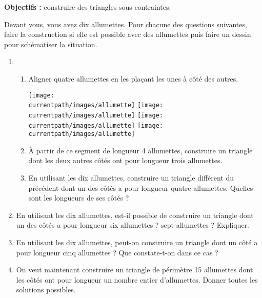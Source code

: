 \begin{activite}
   \begin{changemargin}{-10mm}{-10mm}
      {\bf Objectifs :} construire des triangles sous contraintes.

      Devant vous, vous avez dix allumettes. Pour chacune des questions suivantes, faire la construction si elle est possible avec des allumettes puis faire un dessin pour schématiser la situation.
      \begin{enumerate}
         \item
         \begin{enumerate}
            \item Aligner quatre allumettes en les plaçant les unes à côté des autres.
            \smallskip
            \begin{center}
               \texttt{[image: \\currentpath/images/allumette]}
               \texttt{[image: \\currentpath/images/allumette]}
               \texttt{[image: \\currentpath/images/allumette]}
               \texttt{[image: \\currentpath/images/allumette]}
            \end{center}
            \smallskip
            \item À partir de ce segment de longueur 4 allumettes, construire un triangle dont les deux autres côtés ont pour longueur trois allumettes.
            \vspace*{27mm}
            \item En utilisant les dix allumettes, construire un triangle différent du précédent dont un des côtés a pour longueur quatre allumettes. Quelles sont les longueurs de ses côtés ?
            \vspace*{27mm}
         \end{enumerate}
         \item En utilisant les dix allumettes, est-il possible de construire un triangle dont un des côtés a pour longueur six allumettes ? sept allumettes ? Expliquer.
         \vspace*{27mm}
         \item En utilisant les dix allumettes, peut-on construire un triangle dont un côté a pour longueur cinq allumettes ? Que constate-t-on dans ce cas ?
         \vspace*{27mm}
         \item On veut maintenant construire un triangle de périmètre 15 allumettes dont les côtés ont pour longueur un nombre entier d'allumettes. Donner toutes les solutions possibles.         
      \end{enumerate}
   \end{changemargin}
\end{activite}
